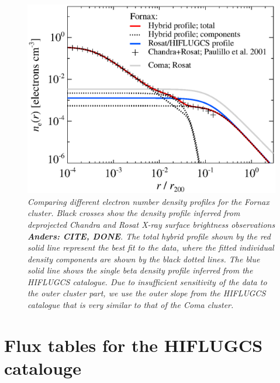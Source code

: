 \documentclass[10pt,aps,pra,reprint,amsmath,amsfonts,amssymb,showpacs,nofootinbib,floatfix]{revtex4-1}
\begin{document}
\begin{figure}%
 \includegraphics[width=0.99\columnwidth]{figures/dens.fornax.eps}
 \caption{\it Comparing different electron number density profiles for
   the Fornax cluster. Black crosses show the density profile inferred
   from deprojected Chandra and Rosat X-ray surface brightness
   observations \cite{2002ApJ...565..883P} {\bf Anders: CITE, DONE}. The
   total hybrid profile shown by the red solid line represent the best
   fit to the data, where the fitted individual density components are
   shown by the black dotted lines. The blue solid line shows the
   single beta density profile inferred from the HIFLUGCS
   catalogue. Due to insufficient sensitivity of the data to the outer
   cluster part, we use the outer slope from the HIFLUGCS catalogue
   that is very similar to that of the Coma cluster.}
 \label{fig:dens_fornax}
\end{figure}


\section{Flux tables for the HIFLUGCS catalouge}
\end{document}
